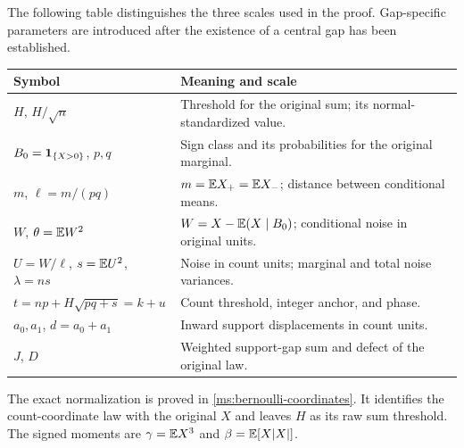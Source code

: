 The following table distinguishes the three scales used in the proof.
Gap-specific parameters are introduced after the existence of a central
gap has been established.
\begin{center}\small
\begin{tabular}{@{}P{.27\linewidth}P{.66\linewidth}@{}}
\toprule
Symbol & Meaning and scale \\
\midrule
$H$, $H/\sqrt n$ & Threshold for the original sum; its normal-standardized value. \\
$B_0=\mathbf 1_{\{X>0\}}$, $p,q$ & Sign class and its probabilities for the original marginal. \\
$m$, $\ell=m/(pq)$ & $m=\mathbb E X_+=\mathbb E X_-$; distance between conditional means. \\
$W$, $\theta=\mathbb E W^2$ & $W=X-\mathbb E(X\mid B_0)$; conditional noise in original units. \\
$U=W/\ell$, $s=\mathbb E U^2$, $\lambda=ns$ & Noise in count units; marginal and total noise variances. \\
$t=np+H\sqrt{pq+s}=k+u$ & Count threshold, integer anchor, and phase. \\
$a_0,a_1$, $d=a_0+a_1$ & Inward support displacements in count units. \\
$J$, $D$ & Weighted support-gap sum and defect of the original law. \\
\bottomrule
\end{tabular}
\end{center}
The exact normalization is proved in \eqref{ms:bernoulli-coordinates}.
It identifies the count-coordinate law with the original $X$ and leaves
$H$ as its raw sum threshold. The signed moments are
$\gamma=\mathbb E X^3$ and $\beta=\mathbb E[X|X|]$.
